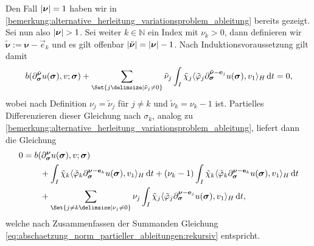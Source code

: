 \documentclass[../main.tex]{subfiles}
\begin{document}
\begin{Satz}
\begin{Beweis}
        Den Fall $\lvert\bm\nu\rvert = 1$ haben wir in \cref{bemerkung:alternative_herleitung_variationsproblem_ableitung} bereits gezeigt.
        Sei nun also $\lvert\bm\nu\rvert > 1$.
        Sei weiter $k \in \mathbb{N}$ ein Index mit $\nu_{k} > 0$, dann definieren wir $\tilde{\bm\nu} := \bm\nu - \vec e_{k}$ und es gilt offenbar $\lvert\tilde{\bm\nu}\rvert = \lvert\bm\nu\rvert - 1$.
        Nach Induktionsvoraussetzung gilt damit
        \begin{equation}
            b(\partial^{\tilde{\bm\nu}}_{\bm\sigma} u(\bm\sigma), v; \bm\sigma) + \sum_{\Set{j \given \tilde{\nu}_{j} \neq 0}} \tilde{\nu}_{j} \int_{I} \tilde{\chi}_{j} \skp{\tilde{\varphi}_{j} \partial^{\tilde{\bm\nu} - \vec e_{j}}_{\bm\sigma} u(\bm\sigma)}{v_{1}}{H} \diff t = 0,
        \end{equation}
        wobei nach Definition $\nu_{j} = \tilde{\nu}_{j}$ für $j \neq k$ und $\tilde{\nu}_{k} = \nu_{k} - 1$ ist.
        Partielles Differenzieren dieser Gleichung nach $\sigma_{k}$, analog zu \cref{bemerkung:alternative_herleitung_variationsproblem_ableitung}, liefert dann die Gleichung
        \begin{align}
            0 &=
                b(\partial^{\bm\nu}_{\bm\sigma} u(\bm\sigma), v; \bm\sigma)
           \\&\qquad          + \int_{I} \tilde{\chi}_{k} \skp{\tilde{\varphi}_{k} \partial^{\bm\nu - \vec e_{k}}_{\bm\sigma} u(\bm\sigma)}{v_{1}}{H} \diff t
                + (\nu_{k} - 1) \int_{I} \tilde{\chi}_{k} \skp{\tilde{\varphi}_{k} \partial^{\bm\nu - \vec e_{k}}_{\bm\sigma} u(\bm\sigma) }{v_{1}}{H} \diff t
           \\&\qquad     + \sum_{\Set{j \neq k \given \nu_{j} \neq 0}} \nu_{j} \int_{I} \tilde{\chi}_{j} \skp{\tilde{\varphi}_{j} \partial^{\bm\nu - \vec e_{j}}_{\bm\sigma} u(\bm\sigma)}{v_{1}}{H} \diff t,
        \end{align}
        welche nach Zusammenfassen der Summanden Gleichung \cref{eq:abschaetzung_norm_partieller_ableitungen:rekursiv} entspricht.


\end{Beweis}
\end{Satz}
\end{document}
